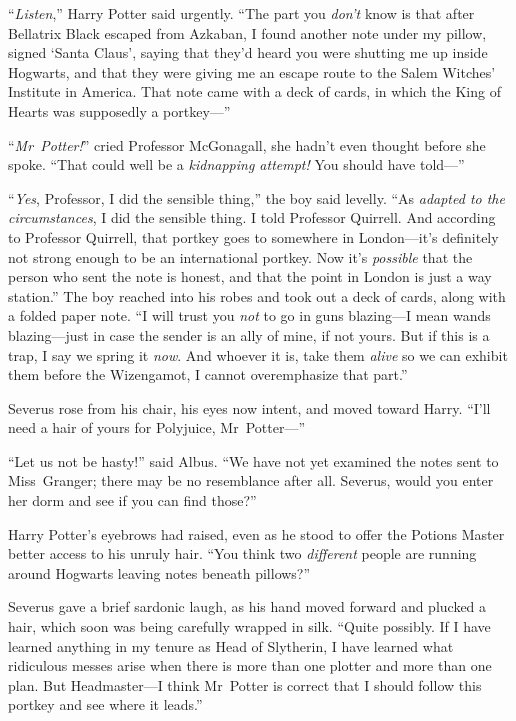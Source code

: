 “\emph{Listen},” Harry Potter said urgently. “The part you \emph{don’t} know is that after Bellatrix Black escaped from Azkaban, I found another note under my pillow, signed ‘Santa Claus’, saying that they’d heard you were shutting me up inside Hogwarts, and that they were giving me an escape route to the Salem Witches’ Institute in America. That note came with a deck of cards, in which the King of Hearts was supposedly a portkey—”

“\emph{Mr~Potter!}” cried Professor McGonagall, she hadn’t even thought before she spoke. “That could well be a \emph{kidnapping attempt!} You should have told—”

“\emph{Yes}, Professor, I did the sensible thing,” the boy said levelly. “As \emph{adapted to the circumstances}, I did the sensible thing. I told Professor Quirrell. And according to Professor Quirrell, that portkey goes to somewhere in London—it’s definitely not strong enough to be an international portkey. Now it’s \emph{possible} that the person who sent the note is honest, and that the point in London is just a way station.” The boy reached into his robes and took out a deck of cards, along with a folded paper note. “I will trust you \emph{not} to go in guns blazing—I mean wands blazing—just in case the sender is an ally of mine, if not yours. But if this is a trap, I say we spring it \emph{now}. And whoever it is, take them \emph{alive} so we can exhibit them before the Wizengamot, I cannot overemphasize that part.”

Severus rose from his chair, his eyes now intent, and moved toward Harry. “I’ll need a hair of yours for Polyjuice, Mr~Potter—”

“Let us not be hasty!” said Albus. “We have not yet examined the notes sent to Miss~Granger; there may be no resemblance after all. Severus, would you enter her dorm and see if you can find those?”

Harry Potter’s eyebrows had raised, even as he stood to offer the Potions Master better access to his unruly hair. “You think two \emph{different} people are running around Hogwarts leaving notes beneath pillows?”

Severus gave a brief sardonic laugh, as his hand moved forward and plucked a hair, which soon was being carefully wrapped in silk. “Quite possibly. If I have learned anything in my tenure as Head of Slytherin, I have learned what ridiculous messes arise when there is more than one plotter and more than one plan. But Headmaster—I think Mr~Potter is correct that I should follow this portkey and see where it leads.”

